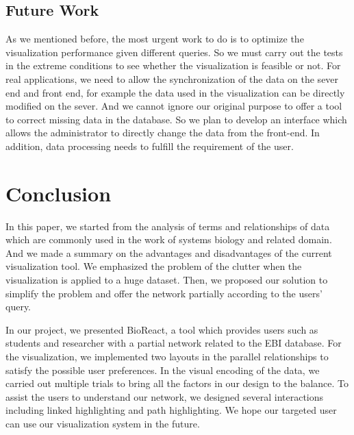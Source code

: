 \documentclass[journal]{vgtc}                %
\begin{document}
\subsection{Future Work}
As we mentioned before, the most urgent work to do is to optimize the visualization performance given different queries. So we must carry out the tests in the extreme conditions to see whether the visualization is feasible or not. For real applications, we need to allow the synchronization of the data on the sever end and front end, for example the data used in the visualization can be directly modified on the sever.  And we cannot ignore our original purpose to offer a tool to correct missing data in the database. So we plan to develop an interface which allows the administrator to directly change the data from the front-end. In addition, data processing needs to fulfill the requirement of the user.


\section{Conclusion}
In this paper, we started from the analysis of terms and relationships of data which are commonly used in the work of systems biology and related domain. And we made a summary on the advantages and disadvantages of the current visualization tool. We emphasized the problem of the clutter when the visualization is applied to a huge dataset. Then, we proposed our solution to simplify the problem and offer the network partially according to the users' query.

In our project, we presented BioReact, a tool which provides users such as students and researcher with a partial network related to the EBI database. For the visualization, we implemented two layouts in the parallel relationships to satisfy the possible user preferences. In the visual encoding of the data, we carried out multiple trials to bring all the factors in our design to the balance. To assist the users to understand our network, we designed several interactions including linked highlighting and path highlighting. We hope our targeted user can use our visualization system in the future.












%

%
%
%


\end{document}
